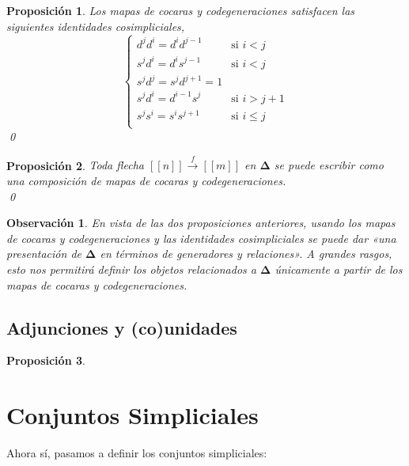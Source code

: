 \documentclass[11pt]{report}
\theoremstyle{colored}
\newtheorem{proposition}{Proposición}[section]
\newtheorem{remark}{Observación}[section]
\newcommand{\nat}[1]{[\![#1]\!]}
\newcommand{\ord}[1]{\nat{#1}}
\newcommand{\ordcat}{\boldsymbol{\Delta}}
\begin{document}
\begin{proposition} Los mapas de cocaras y codegeneraciones satisfacen las siguientes \textit{identidades cosimpliciales},
\[
\begin{cases}
d^jd^i = d^id^{j-1} &\text{si $i < j$}\\
s^jd^i = d^is^{j-1} &\text{si $i < j$}\\
s^jd^j = s^jd^{j+1} = 1\\
s^jd^i = d^{i-1}s^j &\text{si $i > j+1$}\\
s^js^i = s^is^{j+1} &\text{si $i \leq j$}\\
\end{cases}
\]
\qed \\
\end{proposition}

\begin{proposition} Toda flecha $\ord{n} \xrightarrow{f} \ord{m}$ en $\ordcat$ se puede escribir como una composición de mapas de cocaras y codegeneraciones. \\ \qed
\end{proposition}

\begin{remark} En vista de las dos proposiciones anteriores,  usando los mapas de cocaras y codegeneraciones y las identidades cosimpliciales se puede dar «una presentación de $\ordcat$ en términos de generadores y relaciones». A grandes rasgos, esto nos permitirá definir los objetos relacionados a $\ordcat$ únicamente a partir de los mapas de cocaras y codegeneraciones.
\end{remark}

\subsection{Adjunciones y (co)unidades}


\begin{proposition}
\label{lema-adj-cuadrados}
\end{proposition}
\section{Conjuntos Simpliciales}

Ahora sí, pasamos a definir los conjuntos simpliciales:
\end{document}
